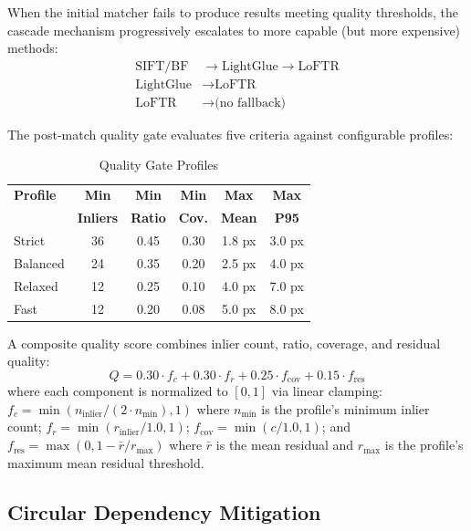 \documentclass[lettersize,journal]{IEEEtran}
\begin{document}
When the initial matcher fails to produce results meeting quality thresholds, the cascade mechanism progressively escalates to more capable (but more expensive) methods:
\begin{align}
\text{SIFT/BF} &\rightarrow \text{LightGlue} \rightarrow \text{LoFTR} \\
\text{LightGlue} &\rightarrow \text{LoFTR} \\
\text{LoFTR} &\rightarrow \text{(no fallback)}
\end{align}

The post-match quality gate evaluates five criteria against configurable profiles:

\begin{table}[htbp]
\caption{Quality Gate Profiles}
\label{tab:quality_profiles}
\centering
\small
\begin{tabular}{@{}lccccc@{}}
\toprule
\textbf{Profile} & \textbf{Min} & \textbf{Min} & \textbf{Min} & \textbf{Max} & \textbf{Max} \\
 & \textbf{Inliers} & \textbf{Ratio} & \textbf{Cov.} & \textbf{Mean} & \textbf{P95} \\
\midrule
Strict & 36 & 0.45 & 0.30 & 1.8 px & 3.0 px \\
Balanced & 24 & 0.35 & 0.20 & 2.5 px & 4.0 px \\
Relaxed & 12 & 0.25 & 0.10 & 4.0 px & 7.0 px \\
Fast & 12 & 0.20 & 0.08 & 5.0 px & 8.0 px \\
\bottomrule
\end{tabular}
\end{table}

A composite quality score combines inlier count, ratio, coverage, and residual quality:
\begin{equation}
Q = 0.30 \cdot f_c + 0.30 \cdot f_r + 0.25 \cdot f_{\text{cov}} + 0.15 \cdot f_{\text{res}}
\end{equation}
where each component is normalized to $[0, 1]$ via linear clamping: $f_c = \min(n_{\text{inlier}} / (2 \cdot n_{\min}), 1)$ where $n_{\min}$ is the profile's minimum inlier count; $f_r = \min(r_{\text{inlier}} / 1.0, 1)$; $f_{\text{cov}} = \min(c / 1.0, 1)$; and $f_{\text{res}} = \max(0, 1 - \bar{r} / r_{\max})$ where $\bar{r}$ is the mean residual and $r_{\max}$ is the profile's maximum mean residual threshold.

\subsection{Circular Dependency Mitigation}
\end{document}
